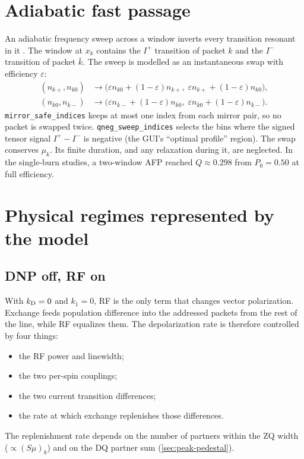 \documentclass[11pt]{article}
\newcommand{\Iplus}{I^{+}}
\newcommand{\Iminus}{I^{-}}
\newcommand{\kb}{\bar{k}}
\newcommand{\code}[1]{\texttt{#1}}
\begin{document}
\section{Adiabatic fast passage}
\label{sec:afp}

An adiabatic frequency sweep across a window inverts every transition resonant in it
\cite{GarwoodDelaBarre2001}. The window at \(x_k\) contains the \(\Iplus\) transition of packet
\(k\) and the \(\Iminus\) transition of packet \(\kb\). The sweep is modelled as an instantaneous
swap with efficiency \(\varepsilon\):
\begin{align}
(n_{k+},n_{k0})&\to\bigl(\varepsilon n_{k0}+(1-\varepsilon)n_{k+},\;\varepsilon n_{k+}+(1-\varepsilon)n_{k0}\bigr),\\
(n_{\kb0},n_{\kb-})&\to\bigl(\varepsilon n_{\kb-}+(1-\varepsilon)n_{\kb0},\;\varepsilon n_{\kb0}+(1-\varepsilon)n_{\kb-}\bigr).
\end{align}
\code{mirror\_safe\_indices} keeps at most one index from each mirror pair, so no packet is
swapped twice. \code{qneg\_sweep\_indices} selects the bins where the signed tensor signal
\(\Iplus-\Iminus\) is negative (the GUI's ``optimal profile'' region). The swap conserves
\(\mu_k\). Its finite duration, and any relaxation during it, are neglected. In the
single-burn studies, a two-window AFP reached \(Q\approx0.298\) from \(P_0=0.50\) at full
efficiency.

\section{Physical regimes represented by the model}
\label{sec:regimes}

\subsection{DNP off, RF on}

With \(k_{\rm D}=0\) and \(k_1=0\), RF is the only term that changes vector polarization. Exchange
feeds population difference into the addressed packets from the rest of the line, while RF
equalizes them. The depolarization rate is therefore controlled by four things:
\begin{itemize}
\item the RF power and linewidth;
\item the two per-spin couplings;
\item the two current transition differences;
\item the rate at which exchange replenishes those differences.
\end{itemize}
The replenishment rate depends on the number of partners within the ZQ width (\(\propto(S\mu)_k\))
and on the DQ partner sum (\cref{sec:peak-pedestal}).
\end{document}

